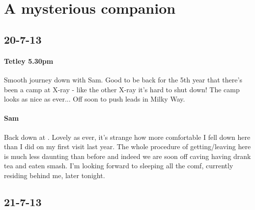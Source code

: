 \begin{marginfigure}
\end{marginfigure}

\section{A mysterious companion}

\subsection{20-7-13}

\paragraph{Tetley 5.30pm}
Smooth journey down with Sam. Good to be back for the 5th year that there’s been a camp at X-ray - like the other X-ray it’s hard to shut down! The camp looks as nice as ever... Off soon to push leads in Milky Way.

\paragraph{Sam}
Back down at . Lovely as ever, it’s strange how more comfortable I fell down here than I did on my first visit last year. The whole procedure of getting/leaving here is much less daunting than before and indeed we are soon off caving having drank tea and eaten smash. I’m looking forward to sleeping all the comf, currently residing behind me, later tonight.


\subsection{21-7-13}

